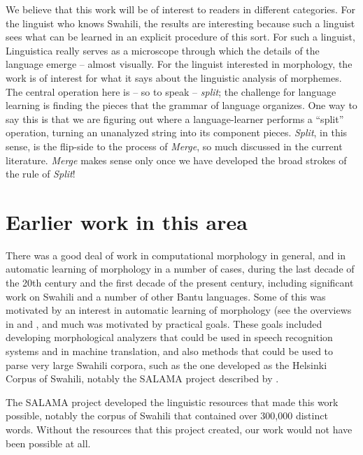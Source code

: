 \documentclass[output=paper,colorlinks,citecolor=brown]{langscibook}
\begin{document}
We believe that this work will be of interest to readers in different categories. For the linguist who knows Swahili, the results are interesting because such a linguist sees what can be learned in an explicit procedure of this sort. For such a linguist, Linguistica really serves as a microscope through which the details of the language emerge -- almost visually. For the linguist interested in morphology, the work is of interest for what it says about the linguistic analysis of morphemes. The central operation here is -- so to speak -- \textit{split}; the challenge for language learning is finding the pieces that the grammar of language organizes. One way to say this is that we are figuring out where a language-learner performs a ``split'' operation, turning an unanalyzed string into its component pieces. \textit{Split}, in this sense, is the flip-side to the process of \textit{Merge}, so much discussed in the current literature. \textit{Merge} makes sense only once we have developed the broad strokes of the rule of \textit{Split}!


\section{Earlier work in this area}

There was a good deal of work in computational morphology in general, and in automatic learning of morphology in a number of cases, during the last decade of the 20th century and the first decade of the present century, including significant work on Swahili and a number of other Bantu languages. Some of this was motivated by an interest in automatic learning of morphology (see the overviews in \cite{Goldsmith201014} and \cite{GoldsmithEtAl2017}, and much was motivated by practical goals. These goals included developing morphological analyzers that could be used in speech recognition systems and in machine translation, and also methods that could be used to parse very large Swahili corpora, such as the one developed as the Helsinki Corpus of Swahili, notably the SALAMA project described by \cite{Hurskainen1992, Hurskainen1999, Hurskainen2004Compilers}. 

The SALAMA project developed the linguistic resources that made this work possible, notably the corpus of Swahili that contained over 300,000 distinct words. Without the resources that this project created, our work would not have been possible at all. 
\end{document}
